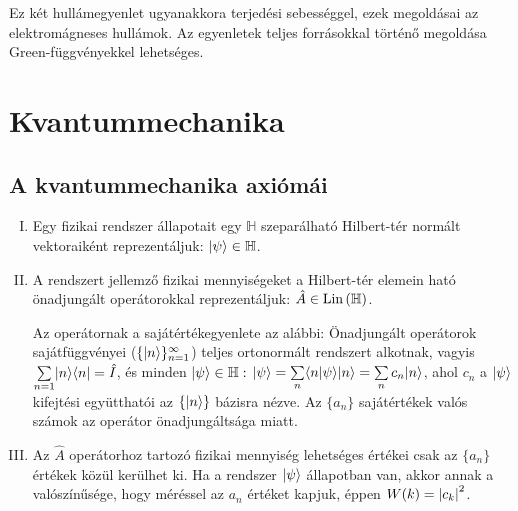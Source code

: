     Ez két hullámegyenlet ugyanakkora terjedési sebességgel, ezek megoldásai az elektromágneses hullámok. Az egyenletek teljes forrásokkal történő megoldása Green-függvényekkel lehetséges. 
    
    
 \section{Kvantummechanika}\label{ss:01-kvantum}
  
  \subsection{A kvantummechanika axiómái}
   
   \begin{enumerate}[I.]
    \item Egy fizikai rendszer állapotait egy $\mathbb{H}$ szeparálható Hilbert-tér normált vektoraiként reprezentáljuk: $\lvert\psi\rangle\in\mathbb{H}$. 
    \item A rendszert jellemző fizikai mennyiségeket a Hilbert-tér elemein ható önadjungált operátorokkal reprezentáljuk: $\hat{A}\in\mathop{\mathrm{Lin}}\nolimits{(\mathbb{H})}$.
    
    Az operátornak a sajátértékegyenlete az alábbi:
    Önadjungált operátorok sajátfüggvényei ($\{\lvert n\rangle\}_{n=1}^{\infty}$) teljes ortonormált rendszert alkotnak, vagyis $\sum\limits_{n=1}^{ }\lvert n\rangle\langle n\rvert=\hat{I}$, és minden $\lvert\psi\rangle\in\mathbb{H}:$ $\lvert\psi\rangle=\sum\limits_{n}^{} \langle n\rvert\psi\rangle\lvert n\rangle=\sum\limits_{n}^{} c_n\lvert n\rangle$, ahol $c_n$ a $\lvert\psi\rangle$ kifejtési együtthatói az $\{\lvert n\rangle\}$ bázisra nézve. Az $\{a_n\}$ sajátértékek valós számok az operátor önadjungáltsága miatt.
    
    \item Az $\hat{A}$ operátorhoz tartozó fizikai mennyiség lehetséges értékei csak az $\{a_n\}$ értékek közül kerülhet ki. Ha a rendszer $\lvert\psi\rangle$ állapotban van, akkor annak a valószínűsége, hogy méréssel az $a_n$ értéket kapjuk, éppen $W(k)=\left\lvert c_k\right\rvert^2$.
    

\end{enumerate}
